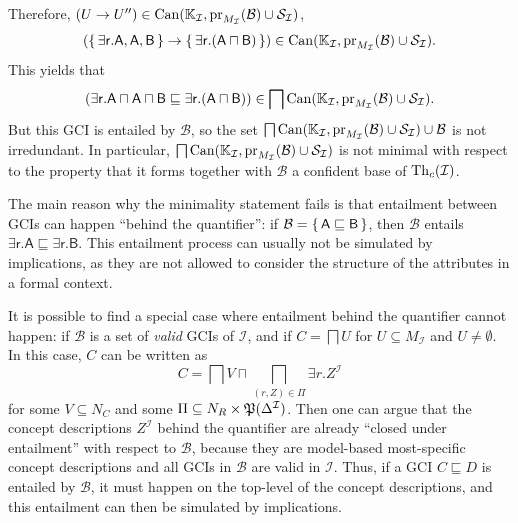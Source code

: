 \begin{Example}
  Therefore, $(U \to U'') \in \operatorname{Can}({\mathbb{K}}_{\mathcal{I}},
  \operatorname{pr}_{M_{\mathcal{I}}}(\mathcal{B}) \cup \mathcal{S}_{\mathcal{I}})$, \ie
  \begin{equation*}
    ({\{\, \mathsf{\exists r. A}, \mathsf{A}, \mathsf{B} \,\}} \to {\ensuremath{\{\, \mathsf{\exists r. (A
        \sqcap B)} \,\}}}) \in \operatorname{Can}({\mathbb{K}}_{\mathcal{I}}, \operatorname{pr}_{M_{\mathcal{I}}}(\mathcal{B}) \cup
    \mathcal{S}_{\mathcal{I}}).
  \end{equation*}
  This yields that
  \begin{equation*}
    (\mathsf{\exists r. A \sqcap A \sqcap B} \sqsubseteq \mathsf{\exists r. (A \sqcap B)})
    \in \bigsqcap \operatorname{Can}({\mathbb{K}}_{\mathcal{I}}, \operatorname{pr}_{M_{\mathcal{I}}}(\mathcal{B}) \cup \mathcal{S}_{\mathcal{I}}).
  \end{equation*}
  But this GCI is entailed by $\mathcal{B}$, so the set $\bigsqcap \operatorname{Can}({\mathbb{K}}_{\mathcal{I}}, \operatorname{pr}_{M_{\mathcal{I}}}(\mathcal{B}) \cup \mathcal{S}_{\mathcal{I}}) \cup
  \mathcal{B}$ is not irredundant.  In particular, $\bigsqcap \operatorname{Can}({\mathbb{K}}_{\mathcal{I}},
  \operatorname{pr}_{M_{\mathcal{I}}}(\mathcal{B}) \cup \mathcal{S}_{\mathcal{I}})$ is not minimal with
  respect to the property that it forms together with $\mathcal{B}$ a confident base of
  $\operatorname{Th}_c(\mathcal{I})$.
\end{Example}

The main reason why the minimality statement fails is that entailment between GCIs can
happen ``behind the quantifier'': if $\mathcal{B} = {\{\, \mathsf{A} \sqsubseteq
  \mathsf{B} \,\}}$, then $\mathcal{B}$ entails $\mathsf{\exists r. A} \sqsubseteq
\mathsf{\exists r. B}$.  This entailment process can usually not be simulated by
implications, as they are not allowed to consider the structure of the attributes in a
formal context.

It is possible to find a special case where entailment behind the quantifier cannot
happen: if $\mathcal{B}$ is a set of \emph{valid} GCIs of $\mathcal{I}$, and if $C =
\bigsqcap U$ for $U \subseteq M_{\mathcal{I}}$ and $U \neq \emptyset$.  In this case, $C$
can be written as
\begin{equation*}
  C = \bigsqcap V \sqcap \bigsqcap_{(r, Z) \in \Pi} \exists r. Z^{\mathcal{I}}
\end{equation*}
for some $V \subseteq N_C$ and some $\Pi \subseteq N_R \times
{\ensuremath{\mathfrak{P}(\Delta^{\mathcal{I}})}}$.  Then one can argue that the concept descriptions
$Z^{\mathcal{I}}$ behind the quantifier are already ``closed under entailment'' with
respect to $\mathcal{B}$, because they are model-based most-specific concept descriptions
and all GCIs in $\mathcal{B}$ are valid in $\mathcal{I}$.  Thus, if a GCI $C \sqsubseteq
D$ is entailed by $\mathcal{B}$, it must happen on the top-level of the concept
descriptions, and this entailment can then be simulated by implications.

